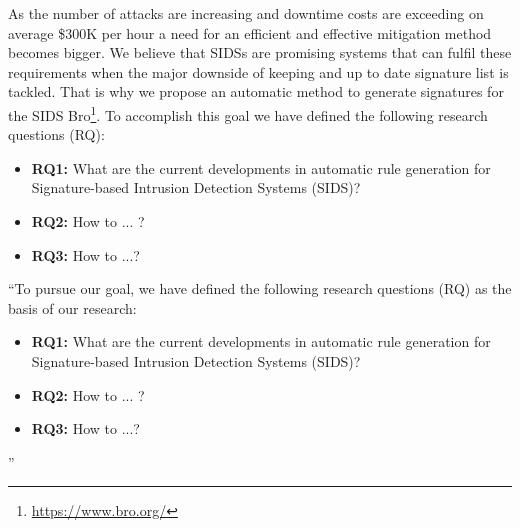 As the number of attacks are increasing and downtime costs are exceeding on average \$300K per hour \cite{ITIC2016} a need for an efficient and effective mitigation method becomes bigger. We believe that SIDSs are promising systems that can fulfil these requirements when the major downside of keeping and up to date signature list is tackled. That is why we propose an automatic method to generate signatures for the SIDS Bro\footnote{\url{https://www.bro.org/}}. To accomplish this goal we have defined the following research questions (RQ):

\begin{itemize}	
	\item \textbf{RQ1:} What are the current developments in automatic rule generation for Signature-based Intrusion Detection Systems (SIDS)?
	\item \textbf{RQ2:} How to ... ?
	 \item \textbf{RQ3:} How to ...?
\end{itemize}









``To pursue our goal, we have defined the following research questions (RQ) as the basis of our research: 
\begin{itemize}	
	\item \textbf{RQ1:} What are the current developments in automatic rule generation for Signature-based Intrusion Detection Systems (SIDS)?
	\item \textbf{RQ2:} How to ... ?
	 \item \textbf{RQ3:} How to ...?
\end{itemize}
''


